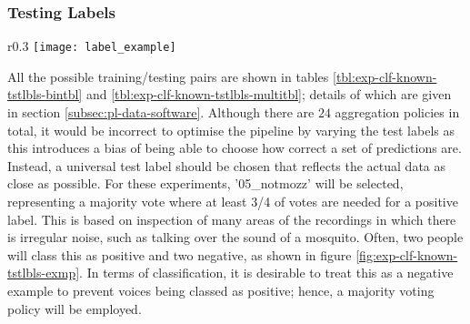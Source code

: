         \subsubsection{Testing Labels}
        \label{subsubsec:exp-clf-known-tstlbls}
            \begin{wrapfigure}{r}{0.3\textwidth}
                \centering
                \texttt{[image: label\_example]}
                \caption{An example of noise where there is $50/50$ disagreement between labellers.}
                \label{fig:exp-clf-known-tstlbls-exmp}
            \end{wrapfigure}
            All the possible training/testing pairs are shown in tables \ref{tbl:exp-clf-known-tstlbls-bintbl} and \ref{tbl:exp-clf-known-tstlbls-multitbl}; details of which are given in section \ref{subsec:pl-data-software}. Although there are $24$ aggregation policies in total, it would be incorrect to optimise the pipeline by varying the test labels as this introduces a bias of being able to choose how correct a set of predictions are. Instead, a universal test label should be chosen that reflects the actual data as close as possible. For these experiments, '05\_notmozz' will be selected, representing a majority vote where at least 3/4 of votes are needed for a positive label. This is based on inspection of many areas of the recordings in which there is irregular noise, such as talking over the sound of a mosquito. Often, two people will class this as positive and two negative, as shown in figure \ref{fig:exp-clf-known-tstlbls-exmp}. In terms of classification, it is desirable to treat this as a negative example to prevent voices being classed as positive; hence, a majority voting policy will be employed.


